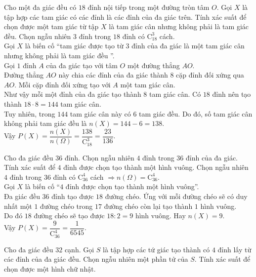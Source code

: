 \begin{vd}%
	Cho một đa giác đều có $18$ đỉnh nội tiếp trong một đường tròn tâm $O$. Gọi $X$ là tập hợp các tam giác có các đỉnh là các đỉnh của đa giác trên. Tính xác suất để chọn được một tam giác từ tập $X$ là tam giác cân nhưng không phải là tam giác đều.
	\loigiai
	{
		Chọn ngẫu nhiên $3$ đỉnh trong $18$ đỉnh có $\mathrm{C}_{18}^3$ cách.\\
		Gọi $X$ là biến cố ``tam giác được tạo từ $3$ đỉnh của đa giác là một tam giác cân nhưng không phải là tam giác đều ''.\\
		Gọi $1$ đỉnh $A$ của đa giác tạo với tâm $O$ một đường thẳng $AO$.\\
		Đường thẳng $AO$ này chia các đỉnh của đa giác thành $8$ cặp đỉnh đối xứng qua $AO$.
		Mỗi cặp đỉnh đối xứng tạo với $A$ một tam giác cân.\\
		Như vậy mỗi một đỉnh của đa giác tạo thành $8$ tam giác cân. Có $18$ đỉnh nên tạo thành $18\cdot 8 = 144$ tam giác cân.\\
		Tuy nhiên, trong $144$ tam giác cân này có $6$ tam giác đều. Do đó, số tam giác cân không phải tam giác đều là $n(X)=144-6=138$.\\
		Vậy $P(X)=\dfrac{n(X)}{n(\Omega)}=\dfrac{138}{\mathrm{C}_{18}^3}=\dfrac{23}{136}$.
	}
\end{vd}
\begin{vd}%
	Cho đa giác đều $36$ đỉnh. Chọn ngẫu nhiên $4$ đỉnh trong $36$ đỉnh của đa giác. Tính xác suất để $4$ đỉnh được chọn tạo thành một hình vuông.
	\loigiai
	{
		Chọn ngẫu nhiên $4$ đỉnh trong $36$ đỉnh có $\mathrm{C}_{36}^4$ cách $\Rightarrow n(\Omega)=\mathrm{C}_{36}^4$.\\
		Gọi $X$ là biến cố ``$4$ đỉnh được chọn tạo thành một hình vuông''.\\
		Đa giác đều $36$ đỉnh tạo được $18$ đường chéo. Ứng với mỗi đường chéo sẽ có duy nhất một $1$ đường chéo trong $17$ đường chéo còn lại tạo thành $1$ hình vuông.\\
		Do đó $18$ đường chéo sẽ tạo được $18\colon 2=9$ hình vuông. Hay $n(X)=9$.\\
		Vậy $P(X)=\dfrac{9}{\mathrm{C}_{36}^4}= \dfrac{1}{6545}$.
	}
\end{vd}
	\begin{vd}%
	Cho đa giác đều $32$ cạnh. Gọi $S$ là tập hợp các tứ giác tạo thành có $4$ đỉnh lấy từ các đỉnh của đa giác đều. Chọn ngẫu nhiên một phần tử của $S$. Tính xác suất để chọn được một hình chữ nhật.
\end{vd}

